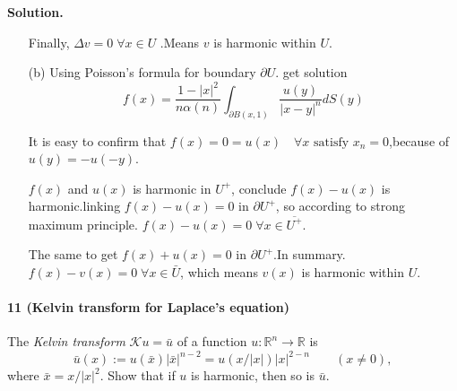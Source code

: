 \documentclass[a4paper]{book}
\newenvironment{solution}%
{\noindent\textbf{Solution.}}%
{\qedhere}
\numberwithin{equation}{chapter}
\theoremstyle{definition}
\begin{document}
\begin{multicols}{2}
\begin{solution}
\begin{itemize}
	Finally, $\Delta v = 0 \; \forall x \in U$ .Means $v$ is harmonic within $U$.
	
	\item[(b)] Using Poisson's formula for boundary $\partial U$. get solution
	$$ f(x) = \frac{1 - |x|^2}{n\alpha (n)}\int_{\partial B(x,1)} \frac{u(y)}{|x-y|^n} dS(y) $$
	
	It is easy to confirm that $f(x) = 0 = u(x) \quad \forall x \text{ satisfy }x_n = 0$,because of $u(y) = -u(-y)$.
	
	$f(x)$ and $u(x)$ is harmonic in $U^+$, conclude $ f(x) - u(x) $ is harmonic.linking $f(x) - u(x) = 0 \text{ in } \partial U^+$, so according to strong maximum principle. $f(x) - u(x) = 0 \; \forall x \in \overline{U^+}$.
	
	The same to get $f(x) + u(x) = 0 \text{ in } \partial U^+$.In summary. $f(x) - v(x) = 0 \; \forall x \in \bar{U}$, which means $v(x)$ is harmonic within $U$.
\end{itemize}
\end{solution}


\paragraph{11 (Kelvin transform for Laplace's equation)}
The \textit{Kelvin transform} $\mathcal{K}u = \bar{u}$ of a function $u : \mathbb{R}^n \rightarrow \mathbb{R}$ is 
\begin{equation}\label{2:11:1}
	\bar{u}(x) := u(\bar{x})|\bar{x}|^{n-2} = u(x/|x|)|x|^{2-n}  \qquad (x \neq 0),
\end{equation}
where $\bar{x} = x/|x|^2$. Show that if $u$ is harmonic, then so is $\bar{u}$.


\end{multicols}
\end{document}
